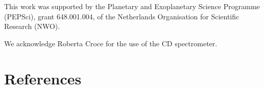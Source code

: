 \documentclass[review]{elsarticle}
\begin{document}
This work was supported by the Planetary and Exoplanetary Science Programme (PEPSci), grant 648.001.004, of the Netherlands Organisation for Scientific Research (NWO). 

We acknowledge Roberta Croce for the use of the CD spectrometer.
\section*{References}
%

\end{document}
